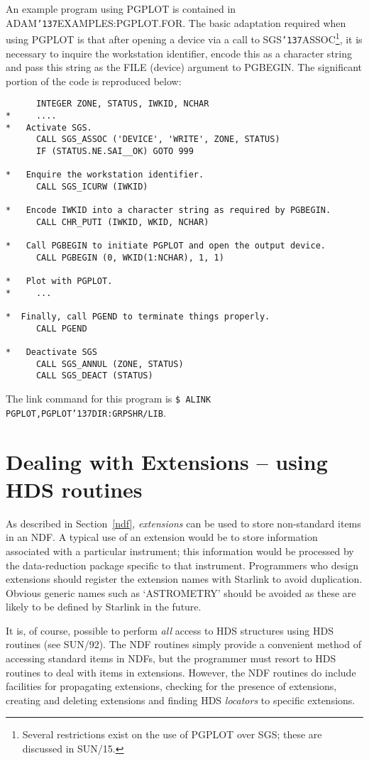 \documentclass[twoside,11pt]{article}
\renewcommand{\_}{{\tt\char'137}}
\newcommand{\xref}[3]{#1}
\newcommand{\xlabel}[1]{}
\begin{document}
An example program using PGPLOT is contained in ADAM\_EXAMPLES:PGPLOT.FOR.
The basic adaptation required when using PGPLOT is that after opening
a device via a call to
SGS\_ASSOC\footnote{Several restrictions exist on the use of PGPLOT over SGS;
these are discussed in \xref{SUN/15}{sun15}{}.}, it is necessary to
inquire the workstation identifier, encode this as a character string and pass
this string as the FILE (device) argument to PGBEGIN.
The significant portion of the code is reproduced below:
\begin{verbatim}
      INTEGER ZONE, STATUS, IWKID, NCHAR
*     ....
*   Activate SGS.
      CALL SGS_ASSOC ('DEVICE', 'WRITE', ZONE, STATUS)
      IF (STATUS.NE.SAI__OK) GOTO 999

*   Enquire the workstation identifier.
      CALL SGS_ICURW (IWKID)

*   Encode IWKID into a character string as required by PGBEGIN.
      CALL CHR_PUTI (IWKID, WKID, NCHAR)

*   Call PGBEGIN to initiate PGPLOT and open the output device.
      CALL PGBEGIN (0, WKID(1:NCHAR), 1, 1)

*   Plot with PGPLOT.
*     ...

*  Finally, call PGEND to terminate things properly.
      CALL PGEND

*   Deactivate SGS
      CALL SGS_ANNUL (ZONE, STATUS)
      CALL SGS_DEACT (STATUS)
\end{verbatim}
The link command for this  program is
{\tt \$ ALINK PGPLOT,PGPLOT\_DIR:GRPSHR/LIB}.

\newpage
\section{Dealing with Extensions -- using HDS routines\label{extensions}\xlabel{dealing_with_extensions}}

As described in Section~\ref{ndf}, {\sl extensions} can be used to store
non-standard items in an NDF.
A typical use of an extension would be to store information
associated with a particular instrument;
this information would be processed by the data-reduction package specific
to that instrument.
Programmers who design extensions  should register
the extension names with Starlink to avoid duplication.
Obvious generic names such as `ASTROMETRY' should be avoided  as these are
likely to be defined by Starlink in the future.

It is, of course, possible to perform {\sl all\/} access to HDS structures
using HDS routines (see \xref{SUN/92}{sun92}{}). The NDF routines simply
provide a convenient method of accessing standard items in NDFs, but
the programmer must
resort to HDS routines to deal with items in extensions.
However, the NDF routines do include facilities for propagating extensions,
checking for the presence of extensions, creating and deleting extensions
and finding HDS {\sl locators\/} to specific extensions.
\end{document}
